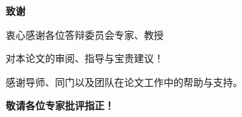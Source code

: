 \documentclass[notheorems]{beamer}
\begin{document}
	\begin{frame}[plain]
		
		\vspace*{0.75cm}
		
		\begin{center}
			{\fontsize{28}{34}\selectfont
				\bfseries\sffamily\color{structure.fg}
				致\hspace{1.2em}谢}
			
			\vspace{1.55cm}
			
			\begin{minipage}{0.82\linewidth}
				\centering
				
				{\fontsize{16}{25}\selectfont\sffamily
					衷心感谢各位答辩委员会专家、教授}
				
				\vspace{0.45cm}
				
				{\fontsize{16}{25}\selectfont\sffamily
					对本论文的审阅、指导与宝贵建议！}
				
				\vspace{1.00cm}
				
				{\fontsize{12}{19}\selectfont\sffamily\color{black!55}
					感谢导师、同门以及团队在论文工作中的帮助与支持。}
				
				\vspace{0.95cm}
				
				{\fontsize{18}{25}\selectfont
					\bfseries\sffamily\color{structure.fg}
					敬请各位专家批评指正！}
				
			\end{minipage}
			
		\end{center}
		
	\end{frame}
	
	
\end{document}

